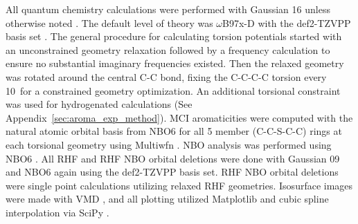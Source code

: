 All quantum chemistry calculations were performed with Gaussian 16 unless otherwise noted \cite{g16}. The default level of theory was $\omega$B97x-D with the def2-TZVPP basis set \cite{Chai2008, Weigend2005}. The general procedure for calculating torsion potentials started with an unconstrained geometry relaxation followed by a frequency calculation to ensure no substantial imaginary frequencies existed. Then the relaxed geometry was rotated around the central C-C bond, fixing the C-C-C-C torsion every 10\textdegree \ for a constrained geometry optimization. An additional torsional constraint was used for hydrogenated calculations (See Appendix~\ref{sec:aroma_exp_method}). MCI aromaticities were computed with the natural atomic orbital basis from NBO6 for all 5 member (C-C-S-C-C) rings at each torsional geometry using Multiwfn \cite{Lu2012}. NBO analysis was performed using NBO6 \cite{NBO6}. All RHF and RHF NBO orbital deletions were done with Gaussian 09 \cite{g09} and NBO6 again using the def2-TZVPP basis set. RHF NBO orbital deletions were single point calculations utilizing relaxed RHF geometries. Isosurface images were made with VMD \cite{HUMP96}, and all plotting utilized Matplotlib and cubic spline interpolation via SciPy \cite{Jones}.
